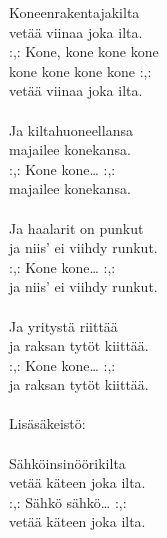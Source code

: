 
            Koneenrakentajakilta \\
            vetää viinaa joka ilta. \\
            :,: Kone, kone kone kone \\
            kone kone kone kone :,: \\
            vetää viinaa joka ilta. \\
\hspace{10mm} \\
            Ja kiltahuoneellansa \\
            majailee konekansa. \\
            :,: Kone kone… :,: \\
            majailee konekansa. \\
\hspace{10mm} \\
            Ja haalarit on punkut \\
            ja niis’ ei viihdy runkut. \\
            :,: Kone kone… :,: \\
            ja niis’ ei viihdy runkut. \\
\hspace{10mm} \\
            Ja yritystä riittää \\
            ja raksan tytöt kiittää. \\
            :,: Kone kone… :,: \\
            ja raksan tytöt kiittää. \\
\hspace{10mm} \\
            Lisäsäkeistö: \\
\hspace{10mm} \\
            Sähköinsinöörikilta \\
            vetää käteen joka ilta. \\
            :,: Sähkö sähkö… :,: \\
            vetää käteen joka ilta. \\
